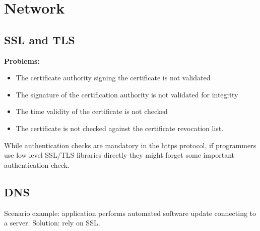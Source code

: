 \documentclass[10pt,a4paper]{book}
\begin{document}
\section{Network}
\subsection{SSL and TLS}
\textbf{Problems:}
\begin{itemize}
\item The certificate authority signing the certificate is not validated
\item The signature of the certification authority is not validated for integrity
\item The time validity of the certificate is not checked
\item The certificate is not checked against the certificate revocation list.
\end{itemize}
While authentication checks are mandatory in the https protocol, if programmers use low level SSL/TLS libraries directly they might forget some important authentication check.
\subsection{DNS}
Scenario example: application performs automated software update connecting to a server. Solution: rely on SSL.
\end{document}
